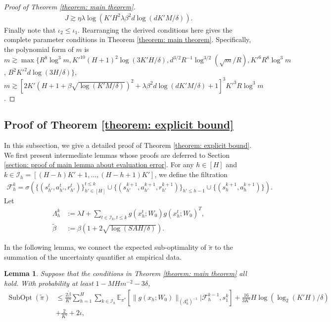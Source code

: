 \documentclass{article} \usepackage{iclr2023/iclr2023_conference,times}
\DeclareMathOperator*{\subopt}{SubOpt}
\newtheorem{lemma}{Lemma}[section]
\begin{document}
\begin{proof}[Proof of Theorem \ref{theorem: main theorem}]
\begin{align*}
    J \gtrsim \eta \lambda \log\left( K' H^2 \lambda  \beta^2 d \log (d K' M / \delta) \right). 
\end{align*}
Finally note that $\iota_2 \leq \iota_1$. Rearranging the derived conditions here gives the complete parameter conditions in Theorem \ref{theorem: main theorem}. Specifically, the polynomial form of $m$ is 
$m \gtrsim  \max\{R^8 \log^3 m, K'^{10} (H + 1)^2 \log(3 K'H/\delta), d^{3/2}  R^{-1} \log^{3/2} (\sqrt{m} /R),  K'^6  R^8 \log^3 m$, $B^2 K'^2 d \log (3 H / \delta) \} $, $ m \gtrsim  [2K'(H + 1 + \beta \sqrt{\log (K' M / \delta)} )^2 + \lambda \beta^2 d \log (d K' M / \delta) + 1]^3 K'^3 R \log^3 m$.







\end{proof}

\subsection{Proof of Theorem \ref{theorem: explicit bound}}
\label{susbection: proof of theorem 2}
In this subsection, we give a detailed proof of Theorem \ref{theorem: explicit bound}. We first present intermediate lemmas whose proofs are deferred to Section \ref{section: proof of main lemma about evaluation error}. For any $h \in [H]$ and $k  \in \mathcal{I}_h = [(H - h) K' + 1, \ldots, (H - h + 1) K']$, we define the filtration 
\begin{align*}
    \mathcal{F}^k_h = \sigma \left(\{(s^t_{h'}, a^t_{h'}, r^t_{h'})\}_{h' \in [H]}^{t \leq k} \cup \{(s^{k+1}_{h'}, a^{k+1}_{h'}, r^{k+1}_{h'})\}_{h' \leq h-1} \cup \{(s^{k+1}_h, a^{k+1}_h)\} \right).
\end{align*}
Let
\begin{align*}
    \Lambda_h^k &:= \lambda I + \sum_{t \in \mathcal{I}_k, t \leq k} g(x^t_h; W_0) g(x^t_h; W_0)^T, \\
    \tilde{\beta} &:= \beta (1 + 2 \sqrt{\log (SAH / \delta)}).
\end{align*}




In the following lemma, we connect the expected sub-optimality of $\tilde{\pi}$ to the summation of the uncertainty quantifier at empirical data. 
\begin{lemma}
Suppose that the conditions in Theorem \ref{theorem: main theorem} all hold. With probability at least $1 - MH m^{-2} - 3 \delta$,
\begin{align*}
   \subopt(\tilde{\pi}) &\leq \frac{2 \tilde{\beta} }{K'}    \sum_{h=1}^H \sum_{k \in \mathcal{I}_h} \mathbb{E}_{\pi^*}  \left[ \| g(x_h; W_0) \|_{(\Lambda_h^k)^{-1}} \bigg| \mathcal{F}^{k-1}_h, s_1^k  \right]  + \frac{16}{3 K'} H \log (\log_2(K'H)/\delta) \\
   &+ \frac{2}{K'} +  2\iota,
\end{align*}
\label{lemma: expected subopt to empirical confidence quantifiers}
\end{lemma}
\end{document}
